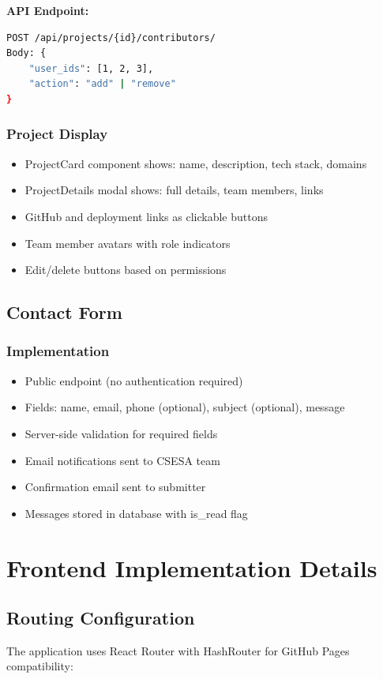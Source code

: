\documentclass[11pt,a4paper]{article}
\begin{document}
\textbf{API Endpoint:}
\begin{lstlisting}[language=bash]
POST /api/projects/{id}/contributors/
Body: {
    "user_ids": [1, 2, 3],
    "action": "add" | "remove"
}
\end{lstlisting}

\subsubsection{Project Display}
\begin{itemize}[leftmargin=*]
    \item ProjectCard component shows: name, description, tech stack, domains
    \item ProjectDetails modal shows: full details, team members, links
    \item GitHub and deployment links as clickable buttons
    \item Team member avatars with role indicators
    \item Edit/delete buttons based on permissions
\end{itemize}

\subsection{Contact Form}

\subsubsection{Implementation}
\begin{itemize}[leftmargin=*]
    \item Public endpoint (no authentication required)
    \item Fields: name, email, phone (optional), subject (optional), message
    \item Server-side validation for required fields
    \item Email notifications sent to CSESA team
    \item Confirmation email sent to submitter
    \item Messages stored in database with is\_read flag
\end{itemize}

\section{Frontend Implementation Details}

\subsection{Routing Configuration}
The application uses React Router with HashRouter for GitHub Pages compatibility:
\end{document}
